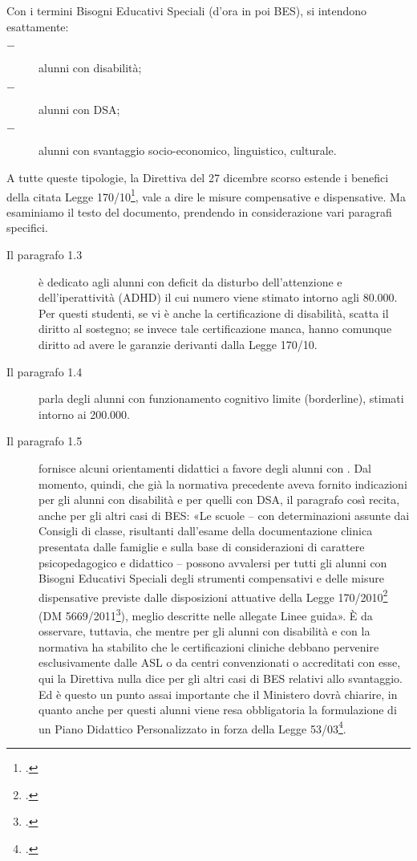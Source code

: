 Con i termini Bisogni Educativi Speciali (d'ora in poi BES), si intendono esattamente:
\begin{description}
	\item[$-$] alunni con disabilità;
	\item[$-$] alunni con DSA;
	\item[$-$] alunni con svantaggio socio-economico, linguistico, culturale.
\end{description}

A tutte queste tipologie, la Direttiva del 27 dicembre scorso estende i benefici della citata Legge 170/10\footcite{legge170}, vale a dire le misure compensative e dispensative. Ma esaminiamo il testo del documento, prendendo in considerazione vari paragrafi specifici.
\begin{description}
	\item[Il paragrafo 1.3]  è dedicato agli alunni con deficit da disturbo dell'attenzione e dell'iperattività (ADHD) il cui numero viene stimato intorno agli 80.000. Per questi studenti, se vi è anche la certificazione di disabilità, scatta il diritto al sostegno; se invece tale certificazione manca, hanno comunque diritto ad avere le garanzie derivanti dalla Legge 170/10.
	\item [Il paragrafo 1.4] parla degli alunni con funzionamento cognitivo limite (borderline), stimati intorno ai 200.000.
	\item [Il paragrafo 1.5] fornisce alcuni orientamenti didattici a favore degli alunni con . Dal momento, quindi, che già la normativa precedente aveva fornito indicazioni per gli alunni con disabilità e per quelli con DSA, il paragrafo così recita, anche per gli altri casi di BES: «Le scuole – con determinazioni assunte dai Consigli di classe, risultanti dall'esame della documentazione clinica presentata dalle famiglie e sulla base di considerazioni di carattere psicopedagogico e didattico – possono avvalersi per tutti gli alunni con Bisogni Educativi Speciali degli strumenti compensativi e delle misure dispensative previste dalle disposizioni attuative della Legge 170/2010\footcite{legge170} (DM 5669/2011\footcite{decreto5669_2011}), meglio descritte nelle allegate Linee guida».
	È da osservare, tuttavia, che mentre per gli alunni con disabilità e con  la normativa ha stabilito che le certificazioni cliniche debbano pervenire esclusivamente dalle ASL o da centri convenzionati o accreditati con esse, qui la Direttiva nulla dice per gli altri casi di BES relativi allo svantaggio. Ed è questo un punto assai importante che il Ministero dovrà chiarire, in quanto anche per questi alunni viene resa obbligatoria la formulazione di un Piano Didattico Personalizzato in forza della Legge 53/03\footcite{Legge_53_2003}.

\end{description}
